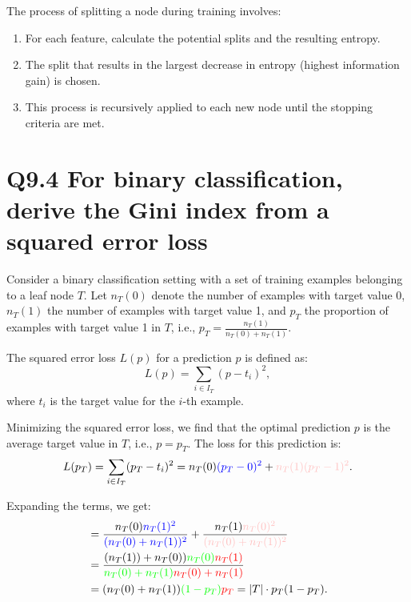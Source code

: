 \documentclass[11pt]{article}
\begin{document}
The process of splitting a node during training involves:

\begin{enumerate}
    \item For each feature, calculate the potential splits and the resulting entropy.
    \item The split that results in the largest decrease in entropy (highest information gain) is chosen.
    \item This process is recursively applied to each new node until the stopping criteria are met.
\end{enumerate}

\section{Q9.4 For binary classification, derive the Gini index from a squared error loss}


Consider a binary classification setting with a set of training examples belonging to a leaf node \( T \). Let \( n_T(0) \) denote the number of examples with target value 0, \( n_T(1) \) the number of examples with target value 1, and \( p_T \) the proportion of examples with target value 1 in \( T \), i.e., \( p_T = \frac{n_T(1)}{n_T(0) + n_T(1)} \).

The squared error loss \( L(p) \) for a prediction \( p \) is defined as:
\[
L(p) = \sum_{i \in I_T} (p - t_i)^2,
\]
where \( t_i \) is the target value for the \( i \)-th example.

Minimizing the squared error loss, we find that the optimal prediction \( p \) is the average target value in \( T \), i.e., \( p = p_T \). The loss for this prediction is:
\[
L(p_T) = \sum_{i \in I_T} (p_T - t_i)^2 = n_T(0)\textcolor{blue}{(p_T - 0)^2} + \textcolor{pink}{n_T(1)(p_T - 1)^2}.
\]

Expanding the terms, we get:
\begin{equation}
\begin{aligned}
&= \frac{n_T(0)\textcolor{blue}{n_T(1)^2}}{\textcolor{blue}{(n_T(0) + n_T(1))^2}} + \frac{n_T(1)\textcolor{pink}{n_T(0)^2}}{\textcolor{pink}{(n_T(0) + n_T(1))^2}} \\
&= \frac{{(n_T(1))} + {n_T(0))}\textcolor{green}{n_T(0)}\textcolor{red}{n_T(1)}}{\textcolor{green}{n_T(0) + n_T(1)}\textcolor{red}{n_T(0) + n_T(1)}}\\
&= ({n_T(0) + n_T(1)})\textcolor{green}{(1 - {p_T})}\textcolor{red}{p_T} = |T| \cdot p_T(1 - {p_T}).
\end{aligned}
\end{equation}
    
\end{document}
